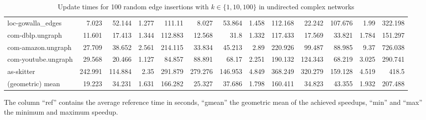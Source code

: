 \begin{landscape}
\begin{table}[h]
\begin{tabular}{l|rrrr|rrrr|rrrr}
 loc-gowalla\_edges    &   7.023 &  52.144 & 1.277 & 111.11  &   8.027 &  53.864 & 1.458 & 112.168 &  22.242 & 107.676 & 1.99  & 322.198 \\
 com-dblp.ungraph     &  11.601 &  17.413 & 1.344 & 112.883 &  12.568 &  31.8   & 1.332 & 117.433 &  17.569 &  33.821 & 1.784 & 151.297 \\
 com-amazon.ungraph   &  27.709 &  38.652 & 2.561 & 214.115 &  33.834 &  45.213 & 2.89  & 220.926 &  99.487 &  88.985 & 9.37  & 726.038 \\
 com-youtube.ungraph  &  29.568 &  20.466 & 1.127 &  84.857 &  88.891 &  68.17  & 2.251 & 190.132 & 124.343 &  68.219 & 3.025 & 290.741 \\
 as-skitter           & 242.991 & 114.884 & 2.35  & 291.879 & 279.276 & 146.953 & 4.849 & 368.249 & 320.279 & 159.128 & 4.519 & 418.5   \\ \midrule \midrule
 (geometric) mean     &  19.223 &  34.231 & 1.631 & 166.282 &  25.327 &  37.686 & 1.798 & 160.411 &  34.823 &  43.355 & 1.932 & 207.488 \\
\bottomrule
\end{tabular}

\caption{Update times for 100 random edge insertions with  $k \in \{1, 10, 100\}$ in undirected complex networks}{The column ``ref'' contains the average reference time in seconds, ``gmean'' the geometric mean of the achieved speedups, ``min'' and ``max'' the minimum and maximum speedup.}
\label{tbl:topkUndirectedComplex}
\end{table}
\end{landscape}


